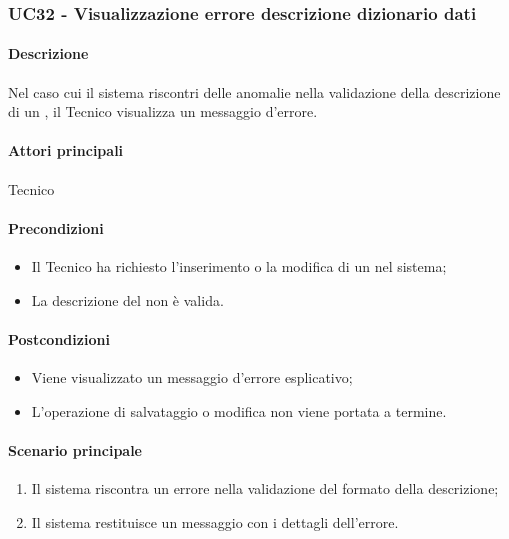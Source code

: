 \subsubsection{UC32 - Visualizzazione errore descrizione dizionario dati}\label{UC32}
\paragraph*{Descrizione}
Nel caso cui il sistema riscontri delle anomalie nella validazione della descrizione di un , il Tecnico visualizza un messaggio d'errore.

\paragraph*{Attori principali}
Tecnico

\paragraph*{Precondizioni}
\begin{itemize}
  \item Il Tecnico ha richiesto l'inserimento o la modifica di un  nel sistema;
  \item La descrizione del  non è valida.
\end{itemize}

\paragraph*{Postcondizioni}
\begin{itemize}
  \item Viene visualizzato un messaggio d'errore esplicativo;
  \item L'operazione di salvataggio o modifica non viene portata a termine.
\end{itemize}

\paragraph*{Scenario principale}
\begin{enumerate}
  \item Il sistema riscontra un errore nella validazione del formato della descrizione;
  \item Il sistema restituisce un messaggio con i dettagli dell'errore.  
\end{enumerate}